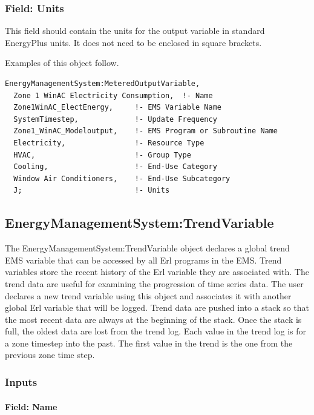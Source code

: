 \subsubsection{Field: Units}\label{field-units-1}

This field should contain the units for the output variable in standard EnergyPlus units. It does not need to be enclosed in square brackets.

Examples of this object follow.

\begin{lstlisting}
EnergyManagementSystem:MeteredOutputVariable,
  Zone 1 WinAC Electricity Consumption,  !- Name
  Zone1WinAC_ElectEnergy,     !- EMS Variable Name
  SystemTimestep,             !- Update Frequency
  Zone1_WinAC_Modeloutput,    !- EMS Program or Subroutine Name
  Electricity,                !- Resource Type
  HVAC,                       !- Group Type
  Cooling,                    !- End-Use Category
  Window Air Conditioners,    !- End-Use Subcategory
  J;                          !- Units
\end{lstlisting}

\subsection{EnergyManagementSystem:TrendVariable}\label{energymanagementsystemtrendvariable}

The EnergyManagementSystem:TrendVariable object declares a global trend EMS variable that can be accessed by all Erl programs in the EMS. Trend variables store the recent history of the Erl variable they are associated with. The trend data are useful for examining the progression of time series data. The user declares a new trend variable using this object and associates it with another global Erl variable that will be logged. Trend data are pushed into a stack so that the most recent data are always at the beginning of the stack. Once the stack is full, the oldest data are lost from the trend log. Each value in the trend log is for a zone timestep into the past. The first value in the trend is the one from the previous zone time step.

\subsubsection{Inputs}\label{inputs-7-008}

\paragraph{Field: Name}\label{field-name-7-005}

